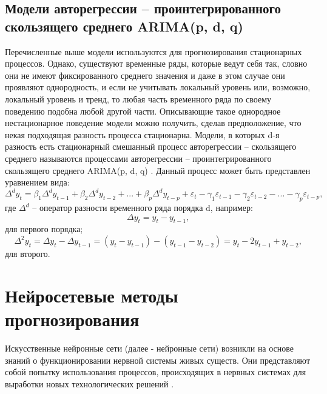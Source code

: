 \documentclass[a4paper,14pt,russian]{extreport}
\begin{document}
 \subsection{Модели авторегрессии -- проинтегрированного скользящего среднего 
 ARIMA(p, d, q)}
 Перечисленные выше модели используются для прогнозирования стационарных 
 процессов. Однако, существуют временные ряды, которые  ведут 
 себя так, словно они не имеют фиксированного среднего значения и даже в 
 этом случае они проявляют однородность, и если не учитывать локальный 
 уровень или, возможно, локальный уровень и тренд, то любая часть временного 
 ряда по своему поведению подобна любой другой части. Описывающие такое 
 однородное нестационарное поведение модели можно получить, сделав 
 предположение, что некая подходящая разность процесса стационарна. 
 Модели, в которых d-я разность есть стационарный смешанный процесс 
 авторегрессии -- скользящего среднего называются процессами авторегрессии 
 -- проинтегрированного скользящего среднего ARIMA(p, d, q) \cite{box2008}. 
 Данный процесс может быть представлен уравнением вида:
 \begin{equation}
	\Delta^d y_t = \beta_1 \Delta^d y_{t-1} + \beta_2 \Delta^d y_{t-2} + ... 
		+ \beta_p \Delta^d y_{t-p} + \varepsilon_t  - \gamma_1 \varepsilon_{t-1} 
		- \gamma_2 \varepsilon_{t-2} - ... - \gamma_p \varepsilon_{t-p}, 
\end{equation}
где $\Delta^d$ --  оператор разности временного ряда порядка d, например: 
\begin{equation}
	\Delta y_t = y_t - y_{t - 1} \text{,} \nonumber
\end{equation}
для первого порядка;
\begin{equation}
	\Delta^2 y_t = \Delta y_t - \Delta y_{t - 1} = (y_t - y_{t - 1}) - (y_{t - 1} - y_{t - 2}) 
		= y_t - 2y_{t - 1} + y_{t - 2} \text{,} \nonumber
\end{equation}
для второго.

\section{Нейросетевые методы прогнозирования}
Искусственные нейронные сети (далее - нейронные сети) возникли на основе 
знаний о функционировании нервной системы живых существ. Они 
представляют собой попытку использования процессов, происходящих в 
нервных системах для выработки новых технологических решений 
\cite{osovskiy2002}. 
\end{document}
